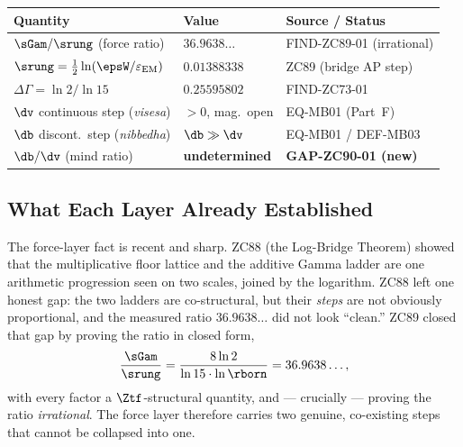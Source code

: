\documentclass[12pt, a4paper]{article}
\renewcommand{\epsEM}{\varepsilon_{\rm EM}}     %
\begin{document}

\begin{keybox}[title={Numerical Summary --- ZC90 (T-canonical)}]
{\footnotesize\renewcommand{\arraystretch}{1.3}
\begin{center}
\begin{tabular}{@{}p{5.2cm}p{3.0cm}p{4.0cm}@{}}
\toprule
\textbf{Quantity} & \textbf{Value} & \textbf{Source / Status} \\
\midrule
$\sGam/\srung$ (force ratio)
  & $36.9638\ldots$
  & FIND-ZC89-01 (irrational) \\
$\srung=\tfrac12\ln(\epsW/\epsEM)$
  & $0.01388338$
  & ZC89 (bridge AP step) \\
$\Delta\Gamma=\ln2/\ln15$
  & $0.25595802$
  & FIND-ZC73-01 \\
$\dv$ continuous step (\emph{visesa})
  & $>0$, mag.\ open
  & EQ-MB01 (Part~F) \\
$\db$ discont.\ step (\emph{nibbedha})
  & $\db\gg\dv$
  & EQ-MB01 / DEF-MB03 \\
$\db/\dv$ (mind ratio)
  & \textbf{undetermined}
  & \textbf{GAP-ZC90-01 (new)} \\
\bottomrule
\end{tabular}
\end{center}}
\end{keybox}

\subsection{What Each Layer Already Established}

The force-layer fact is recent and sharp. ZC88 (the Log-Bridge Theorem)
showed that the multiplicative floor lattice and the additive Gamma
ladder are one arithmetic progression seen on two scales, joined by the
logarithm. ZC88 left one honest gap: the two ladders are co-structural,
but their \emph{steps} are not obviously proportional, and the measured
ratio $36.9638\ldots$ did not look ``clean.'' ZC89 closed that gap by
proving the ratio in closed form,
\[
  \frac{\sGam}{\srung}=\frac{8\ln 2}{\ln 15\cdot\ln\rborn}=36.9638\ldots,
\]
with every factor a $\Ztf$-structural quantity, and --- crucially ---
proving the ratio \emph{irrational}. The force layer therefore carries
two genuine, co-existing steps that cannot be collapsed into one.
\end{document}
